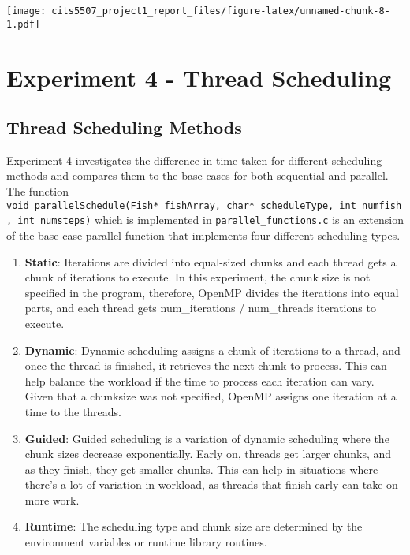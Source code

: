 \documentclass[
]{article}
\begin{document}
\texttt{[image: cits5507\_project1\_report\_files/figure-latex/unnamed-chunk-8-1.pdf]}

\hypertarget{experiment-4---thread-scheduling}{%
\section{Experiment 4 - Thread
Scheduling}\label{experiment-4---thread-scheduling}}

\hypertarget{thread-scheduling-methods}{%
\subsection{Thread Scheduling Methods}\label{thread-scheduling-methods}}

Experiment 4 investigates the difference in time taken for different
scheduling methods and compares them to the base cases for both
sequential and parallel. The function
\texttt{void\ parallelSchedule(Fish*\ fishArray,\ char*\ scheduleType,\ int\ numfish,\ int\ numsteps)}
which is implemented in \texttt{parallel\_functions.c} is an extension
of the base case parallel function that implements four different
scheduling types.

\begin{enumerate}
\def\labelenumi{\arabic{enumi}.}
\item
  \textbf{Static}: Iterations are divided into equal-sized chunks and
  each thread gets a chunk of iterations to execute. In this experiment,
  the chunk size is not specified in the program, therefore, OpenMP
  divides the iterations into equal parts, and each thread gets
  num\_iterations / num\_threads iterations to execute.
\item
  \textbf{Dynamic}: Dynamic scheduling assigns a chunk of iterations to
  a thread, and once the thread is finished, it retrieves the next chunk
  to process. This can help balance the workload if the time to process
  each iteration can vary. Given that a chunksize was not specified,
  OpenMP assigns one iteration at a time to the threads.
\item
  \textbf{Guided}: Guided scheduling is a variation of dynamic
  scheduling where the chunk sizes decrease exponentially. Early on,
  threads get larger chunks, and as they finish, they get smaller
  chunks. This can help in situations where there's a lot of variation
  in workload, as threads that finish early can take on more work.
\item
  \textbf{Runtime}: The scheduling type and chunk size are determined by
  the environment variables or runtime library routines.
\end{enumerate}
\end{document}

